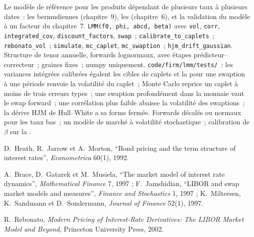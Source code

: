 \begin{build}
 Le modèle de référence pour les produits dépendant de plusieurs taux
à plusieurs dates~: les bermudiennes (chapitre~9), les  (chapitre~6), et la
validation du modèle à un facteur du chapitre~7.
 \texttt{LMM(f0, phi, abcd, beta)} avec \texttt{vol},
\texttt{corr}, \texttt{integrated\_cov}, \texttt{discount\_factors}, \texttt{swap}~;
\texttt{calibrate\_to\_caplets}~; \texttt{rebonato\_vol}~; \texttt{simulate},
\texttt{mc\_caplet}, \texttt{mc\_swaption}~; \texttt{hjm\_drift\_gaussian}.
 Structure de tenor annuelle, forwards lognormaux,  avec
étapes prédicteur--correcteur~; graines fixes~; numpy uniquement.
 \texttt{code/firm/lmm/tests/}~: les variances intégrées calibrées
égalent les cibles de caplets et la  pour une swaption à une période
renvoie la volatilité du caplet~; Monte Carlo reprice un caplet à moins de
trois erreurs types~; une swaption profondément dans la monnaie vaut le swap forward~; une
corrélation plus faible abaisse la volatilité des swaptions~; la dérive HJM de Hull--White
a sa forme fermée.
 Forwards décalés ou normaux pour les taux bas~; un modèle de marché
à volatilité stochastique~; calibration de $\beta$ sur la .
\end{build}

\begin{omsources}
\item D.\ Heath, R.\ Jarrow et A.\ Morton, ``Bond pricing and the term structure of
interest rates'', \emph{Econometrica} 60(1), 1992.
\item A.\ Brace, D.\ Gatarek et M.\ Musiela, ``The market model of interest rate
dynamics'', \emph{Mathematical Finance} 7, 1997 ; F.\ Jamshidian, ``LIBOR and swap
market models and measures'', \emph{Finance and Stochastics} 1, 1997 ; K.\
Miltersen, K.\ Sandmann et D.\ Sondermann, \emph{Journal of Finance} 52(1), 1997.
\item R.\ Rebonato, \emph{Modern Pricing of Interest-Rate Derivatives: The LIBOR
Market Model and Beyond}, Princeton University Press, 2002.
\end{omsources}

